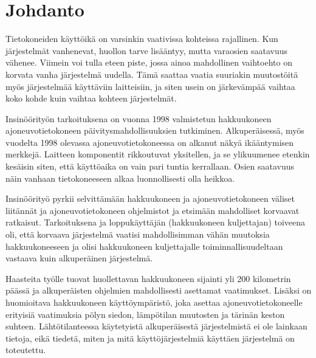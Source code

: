 \newpage

\pagestyle{plain}

\setcounter{page}{1} %
\ClearWallPaper

\chapter{Johdanto}
Tietokoneiden käyttöikä on varsinkin vaativissa kohteissa rajallinen. Kun järjestelmät vanhenevat, huollon tarve lisääntyy, mutta varaosien saatavuus vähenee. Viimein voi tulla eteen piste, jossa ainoa mahdollinen vaihtoehto on korvata vanha järjestelmä uudella. Tämä saattaa vaatia suuriakin muutostöitä myös järjestelmää käyttäviin laitteisiin, ja siten usein on järkevämpää vaihtaa koko kohde kuin vaihtaa kohteen järjestelmät.

Insinöörityön tarkoituksena on vuonna 1998 valmistetun hakkuukoneen ajoneuvotietokoneen päivitysmahdollisuuksien tutkiminen. Alkuperäisessä, myös vuodelta 1998 olevassa ajoneuvotietokoneessa on alkanut näkyä ikääntymisen merkkejä. Laitteen komponentit rikkoutuvat yksitellen, ja se ylikuumenee etenkin kesäisin siten, että käyttöaika on vain pari tuntia kerrallaan. Osien saatavuus näin vanhaan tietokoneeseen alkaa luonnollisesti olla heikkoa.

Insinöörityö pyrkii selvittämään hakkuukoneen ja ajoneuvotietokoneen väliset liitännät ja ajoneuvotietokoneen ohjelmistot ja etsimään mahdolliset korvaavat ratkaisut. Tarkoituksena ja loppukäyttäjän (hakkuukoneen kuljettajan) toiveena oli, että korvaava järjestelmä vaatisi mahdollisimman vähän muutoksia hakkuukoneeseen ja olisi hakkuukoneen kuljettajalle toiminnallisuudeltaan vastaava kuin alkuperäinen järjestelmä.

Haasteita työlle tuovat huollettavan hakkuukoneen sijainti yli 200 kilometrin päässä ja alkuperäisten ohjelmien mahdollisesti asettamat vaatimukset. Lisäksi on huomioitava hakkuukoneen käyttöympäristö, joka asettaa ajoneuvotietokoneelle erityisiä vaatimuksia pölyn siedon, lämpötilan muutosten ja tärinän keston suhteen. Lähtötilanteessa käytetyistä alkuperäisestä järjestelmistä ei ole lainkaan tietoja, eikä tiedetä, miten ja mitä käyttöjärjestelmiä käyttäen järjestelmä on toteutettu.

